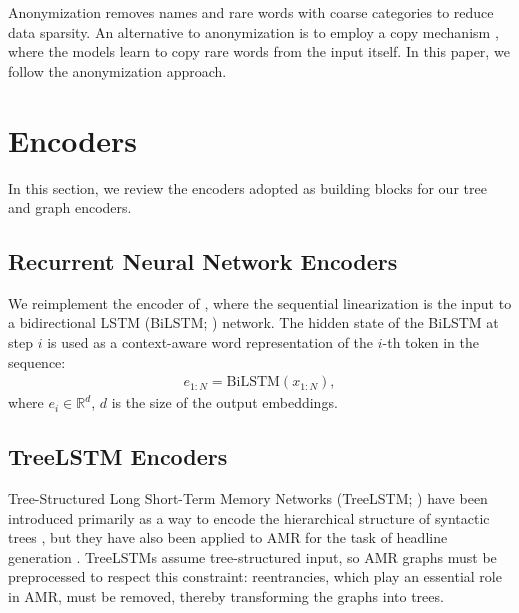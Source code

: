 \documentclass[11pt,a4paper]{article}
\begin{document}
Anonymization removes names and rare words with coarse categories to reduce data sparsity. 
An alternative to anonymization is to employ a copy mechanism \cite{gulcehre2016pointing}, where the models learn to copy rare words from the input itself. In this paper, we follow the anonymization approach. 

\section{Encoders}

In this section, we review the encoders adopted as building blocks for our tree and graph encoders. 

\subsection{Recurrent Neural Network Encoders}
\label{sec:sequential}

We reimplement the encoder of , where the sequential linearization is the input to a bidirectional LSTM (BiLSTM; \citealt{graves2013speech}) network. The hidden state of the BiLSTM at step $i$ is used as a context-aware word representation of the $i$-th token in the sequence:
\begin{align*}
  e_{1:N}=\mathrm{BiLSTM}(x_{1:N}),
\end{align*}
where $e_i \in \mathbb{R}^{d}$, $d$ is the size of the output embeddings. 

\subsection{TreeLSTM Encoders}
\label{sec:tree_encoders}

Tree-Structured Long Short-Term Memory Networks (TreeLSTM; \citealt{tai2015improved}) have been introduced primarily as a way to encode the hierarchical structure of syntactic trees \cite{tai2015improved}, but they have also been applied to AMR for the task of headline generation \cite{takase2016neural}. 
TreeLSTMs assume tree-structured input, so AMR graphs must be preprocessed to respect this constraint: reentrancies, which play an essential role in AMR, must be removed, thereby transforming the graphs into trees. 
\end{document}
